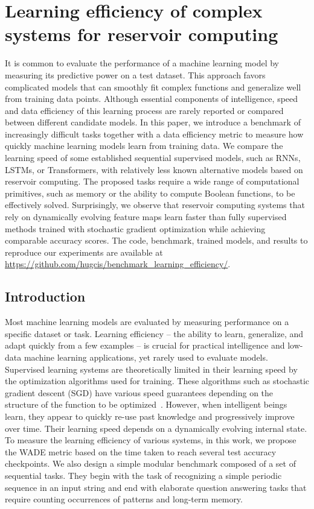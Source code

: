 \chapter{Learning efficiency of complex systems for reservoir computing}
\label{cha:learn-effic-compl}

  It is common to evaluate the performance of a machine learning model by
  measuring its predictive power on a test dataset. This approach favors
  complicated models that can smoothly fit complex functions and generalize well
  from training data points. Although essential components of intelligence,
  speed and data efficiency of this learning process are rarely reported or
  compared between different candidate models. In this paper, we introduce a
  benchmark of increasingly difficult tasks together with a data efficiency
  metric to measure how quickly machine learning models learn from training
  data. We compare the learning speed of some established sequential supervised
  models, such as RNNs, LSTMs, or Transformers, with relatively less known
  alternative models based on reservoir computing. The proposed tasks require a
  wide range of computational primitives, such as memory or the ability to
  compute Boolean functions, to be effectively solved. Surprisingly, we observe
  that reservoir computing systems that rely on dynamically evolving feature
  maps learn faster than fully supervised methods trained with stochastic
  gradient optimization while achieving comparable accuracy scores. The code,
  benchmark, trained models, and results to reproduce our experiments are
  available at {\small\url{https://github.com/hugcis/benchmark_learning_efficiency/}}.


\section{Introduction}
Most machine learning models are evaluated by measuring performance on a
specific dataset or task. Learning efficiency -- the ability to learn,
generalize, and adapt quickly from a few examples -- is crucial for practical
intelligence \parencite{kanazawaGeneralIntelligenceDomainspecific2004} and
low-data machine learning applications, yet rarely used to evaluate models.
Supervised learning systems are theoretically limited in their learning speed by
the optimization algorithms used for training. These algorithms such as
stochastic gradient descent (SGD) have various speed guarantees depending on the
structure of the function to be
optimized~\parencite{bottouOptimizationMethodsLargescale2018}. However, when
intelligent beings learn, they appear to quickly re-use past knowledge and
progressively improve over time. Their learning speed depends on a dynamically
evolving internal state.
To measure the learning efficiency of various systems, in this work, we propose the \ac{WADE}
metric based on the time taken to reach several test accuracy checkpoints. We
also design a simple modular benchmark composed of a set of sequential tasks.
They begin with the task of recognizing a simple periodic sequence in an input
string and end with elaborate question answering tasks that require counting
occurrences of patterns and long-term memory.

